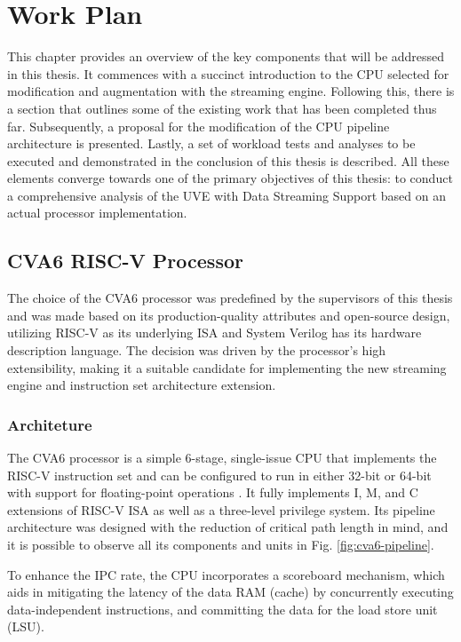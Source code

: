 \chapter{Work Plan}
\label{chapter:work_plan}


This chapter provides an overview of the key components that will be addressed in this thesis. It commences with a succinct introduction to the CPU selected for modification and augmentation with the streaming engine. Following this, there is a section that outlines some of the existing work that has been completed thus far. Subsequently, a proposal for the modification of the CPU pipeline architecture is presented. Lastly, a set of workload tests and analyses to be executed and demonstrated in the conclusion of this thesis is described. All these elements converge towards one of the primary objectives of this thesis: to conduct a comprehensive analysis of the \acrfull{UVE} with Data Streaming Support based on an actual processor implementation.


\section{CVA6 RISC-V Processor}
The choice of the CVA6 processor \cite{CVA6} was predefined by the supervisors of this thesis and was made based on its production-quality attributes and open-source design, utilizing RISC-V as its underlying \acrshort{ISA} and System Verilog has its hardware description language. The decision was driven by the processor's high extensibility, making it a suitable candidate for implementing the new streaming engine and instruction set architecture extension.

\subsection{Architeture}
The CVA6 processor is a simple 6-stage, single-issue CPU that implements the RISC-V instruction set and can be configured to run in either 32-bit or 64-bit with support for floating-point operations \cite{CVA6}. It fully implements I, M, and C extensions of RISC-V \acrshort{ISA} as well as a three-level privilege system. Its pipeline architecture was designed with the reduction of critical path length in mind, and it is possible to observe all its components and units in Fig. \ref{fig:cva6-pipeline}.

To enhance the \acrfull{IPC} rate, the CPU incorporates a scoreboard mechanism, which aids in mitigating the latency of the data RAM (cache) by concurrently executing data-independent instructions, and committing the data for the load store unit (LSU).


